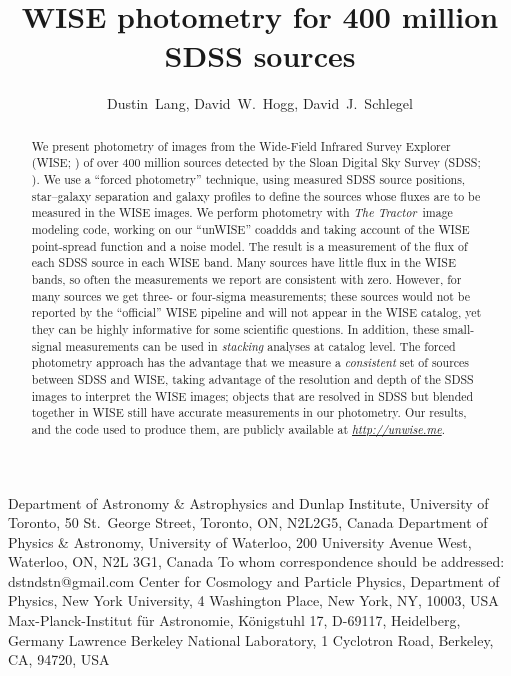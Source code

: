 \documentclass[12pt,preprint]{aastex}
\newcommand{\niceurl}[1]{\href{#1}{\textsl{#1}}}
\newcommand{\Thetractor}{\textsl{The Tractor}}
\begin{document}
\title{WISE photometry for 400 million SDSS sources}
\author{
  Dustin~Lang,
  David~W.~Hogg,
  David~J.~Schlegel}
%
%
{Department of Astronomy \& Astrophysics and Dunlap Institute,
  University of Toronto,
  50 St.~George Street, Toronto, ON, N2L2G5, Canada}
%
{Department of Physics \& Astronomy,
  University of Waterloo,
  200 University Avenue West,
  Waterloo, ON, N2L 3G1, Canada}
%
{To whom correspondence should be addressed: dstndstn@gmail.com}
%
{Center for Cosmology and Particle Physics,
  Department of Physics, New York University,
  4 Washington Place, New York, NY, 10003, USA}
%
{Max-Planck-Institut f\"ur Astronomie,
  K\"onigstuhl 17, D-69117, Heidelberg, Germany}
%
{Lawrence Berkeley National Laboratory,
  1 Cyclotron Road, Berkeley, CA, 94720, USA}
\date{}

\begin{abstract}
We present photometry of images from the Wide-Field Infrared Survey
Explorer (WISE; \citealt{wright}) of over 400 million sources detected
by the Sloan Digital Sky Survey (SDSS; \citealt{york}).
%
%
We use a ``forced photometry'' technique, using measured SDSS source
positions, star--galaxy separation and galaxy profiles to define the
sources whose fluxes are to be measured in the WISE images.
%
We perform photometry with \Thetractor\ image modeling code, working
on our ``unWISE'' coaddds and taking account of the WISE point-spread
function and a noise model.
%
The result is a measurement of the flux of each SDSS source in each
WISE band.  Many sources have little flux in the WISE bands, so often
the measurements we report are consistent with zero.  However, for
many sources we get three- or four-sigma measurements; these sources
would not be reported by the ``official'' WISE pipeline and will not
appear in the
WISE catalog, yet they can be highly informative for some scientific
questions.  In addition, these small-signal measurements can be used
in \emph{stacking} analyses at catalog level.  The forced photometry
approach has the advantage that we measure a \emph{consistent} set of
sources between SDSS and WISE, taking advantage of the resolution and
depth of the SDSS images to interpret the WISE images; objects that
are resolved in SDSS but blended together in WISE still have accurate
measurements in our photometry.
%
Our results, and the code used to produce them, are publicly available
at \niceurl{http://unwise.me}.
\end{abstract}
\end{document}
